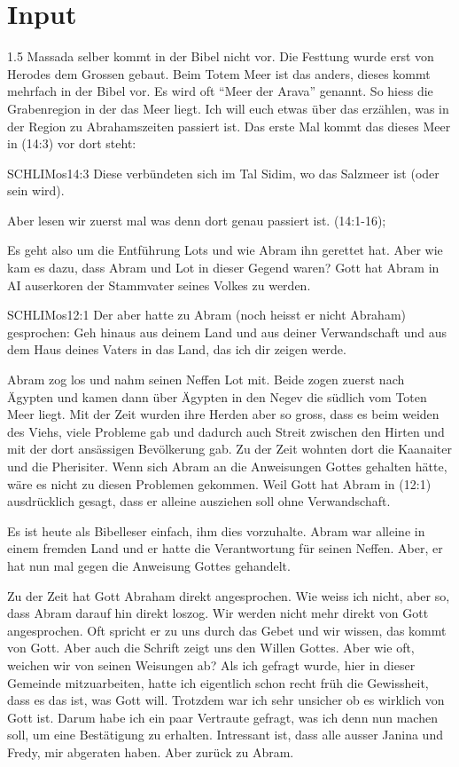 \documentclass[fontsize=14pt]{../../inc/mybib}
\begin{document}
\section{ Input }
\begin{spacing}{1.5}
    Massada selber kommt in der Bibel nicht vor. Die Festtung wurde erst von Herodes dem Grossen gebaut. Beim Totem Meer ist das anders, dieses kommt mehrfach in der Bibel vor. Es wird oft \enquote{Meer der Arava} genannt. So hiess die Grabenregion in der das Meer liegt. Ich will euch etwas über das erzählen, was in der Region zu Abrahamszeiten passiert ist. Das erste Mal kommt das dieses Meer in (14:3) vor dort steht:
    \begin{bibelbox}{SCHL}{IMos}{14:3}
    Diese verbündeten sich im Tal Sidim, wo das Salzmeer ist (oder sein wird).
    \end{bibelbox}
    Aber lesen wir zuerst mal was denn dort genau passiert ist.
    (14:1-16);

    Es geht also um die Entführung Lots und wie Abram ihn gerettet hat. Aber wie kam es dazu, dass Abram und Lot in dieser Gegend waren? Gott hat Abram in AI auserkoren der Stammvater seines Volkes zu werden. 
    \begin{bibelbox}{SCHL}{IMos}{12:1}
    Der \herr{} aber hatte zu Abram (noch heisst er nicht Abraham) gesprochen: Geh hinaus aus deinem Land und aus deiner Verwandschaft und aus dem Haus deines Vaters in das Land, das ich dir zeigen werde.
    \end{bibelbox}
    Abram zog los und nahm seinen Neffen Lot mit. Beide zogen zuerst nach Ägypten und kamen dann über Ägypten in den Negev die südlich vom Toten Meer liegt. 
    Mit der Zeit wurden ihre Herden aber so gross, dass es beim weiden des Viehs, viele Probleme gab und dadurch auch Streit zwischen den Hirten und mit der dort ansässigen Bevölkerung gab. Zu der Zeit wohnten dort die Kaanaiter und die Pherisiter. Wenn sich Abram an die Anweisungen Gottes gehalten hätte, wäre es nicht zu diesen Problemen gekommen. Weil Gott hat Abram in (12:1) ausdrücklich gesagt, dass er alleine ausziehen soll ohne Verwandschaft.
    
    Es ist heute als Bibelleser einfach, ihm dies vorzuhalte. Abram war alleine in einem fremden Land und er hatte die Verantwortung für seinen Neffen. Aber, er hat nun mal gegen die Anweisung Gottes gehandelt.

    Zu der Zeit hat Gott Abraham direkt angesprochen. Wie weiss ich nicht, aber so, dass Abram darauf hin direkt loszog. Wir werden nicht mehr direkt von Gott angesprochen. Oft spricht er zu uns durch das Gebet und wir wissen, das kommt von Gott. Aber auch die Schrift zeigt uns den Willen Gottes. Aber wie oft, weichen wir von seinen Weisungen ab? Als ich gefragt wurde, hier in dieser Gemeinde mitzuarbeiten, hatte ich eigentlich schon recht früh die Gewissheit, dass es das ist, was Gott will. Trotzdem war ich sehr unsicher ob es wirklich von Gott ist. Darum habe ich ein paar Vertraute gefragt, was ich denn nun machen soll, um eine Bestätigung zu erhalten. Intressant ist, dass alle ausser Janina und Fredy, mir abgeraten haben. Aber zurück zu Abram.


\end{spacing}
\end{document}
